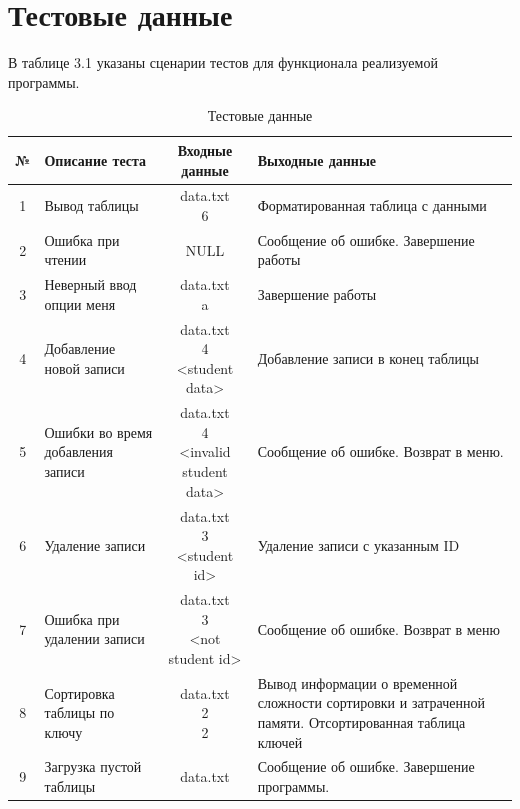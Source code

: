 \pagebreak

\section{Тестовые данные}

В таблице 3.1 указаны сценарии тестов для функционала реализуемой программы.

\begin{table}
	\caption{Тестовые данные}
	\begin{center}
		\begin{tabular}{|c|m{8em}|c|m{12em}|}
			\hline
			№ & Описание теста & Входные данные & Выходные данные \\
			\hline
			1 & Вывод таблицы & \specialcell{data.txt \\ 6} & Форматированная таблица с данными \\
			\hline
			2 & Ошибка при чтении & NULL & Сообщение об ошибке. Завершение работы \\
			\hline
			3 & Неверный ввод опции меня & \specialcell{data.txt \\ a} & Завершение работы \\
			\hline
			4 & Добавление новой записи & \specialcell{data.txt \\ 4 \\<student data>} & Добавление записи в конец таблицы \\
			\hline
			5 & Ошибки во время добавления записи & \specialcell{data.txt \\ 4 \\ <invalid student data>} & Сообщение об ошибке. Возврат в меню.  \\
			\hline
			6 & Удаление записи & \specialcell{data.txt \\ 3 \\ <student id>} & Удаление записи с указанным ID \\
			\hline
			7 & Ошибка при удалении записи & \specialcell{data.txt \\ 3 \\ <not student id>} & Сообщение об ошибке. Возврат в меню \\
			\hline
			8 & Сортировка таблицы по ключу & \specialcell{data.txt \\ 2 \\ 2} & Вывод информации о временной сложности сортировки и затраченной памяти. Отсортированная таблица ключей \\
			\hline
			9 & Загрузка пустой таблицы & data.txt & Сообщение об ошибке. Завершение программы. \\

\end{tabular}
\end{center}
\end{table}

